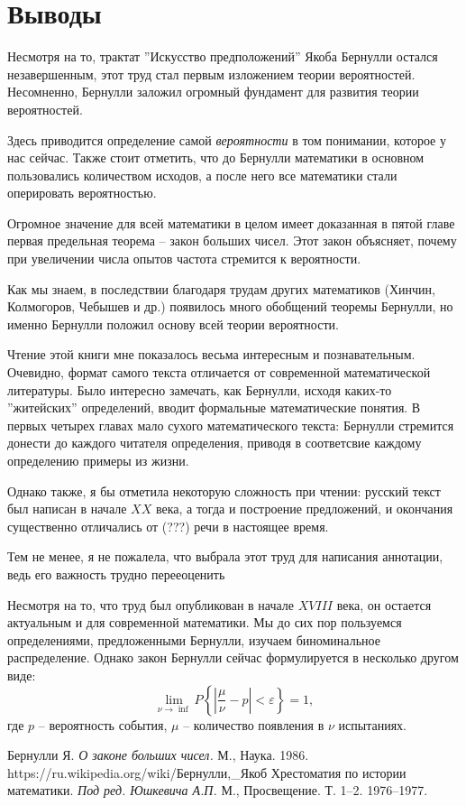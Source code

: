 \documentclass[12pt]{article}
\begin{document}
\newpage
\section{Выводы}
Несмотря на то, трактат ''Искусство предположений'' Якоба Бернулли остался незавершенным, этот труд стал первым изложением теории вероятностей. 
Несомненно, Бернулли заложил огромный фундамент для развития теории вероятностей.

Здесь приводится определение самой \textit{вероятности} в том понимании, которое у нас сейчас.
Также стоит отметить, что до Бернулли математики в основном пользовались количеством исходов, а после него все математики стали оперировать вероятностью.

Огромное значение для всей математики в целом имеет доказанная в пятой главе первая предельная теорема -- закон больших чисел.
Этот закон объясняет, почему при увеличении числа опытов частота стремится к вероятности.

Как мы знаем, в последствии благодаря трудам других математиков (Хинчин, Колмогоров, Чебышев и др.) появилось много обобщений теоремы Бернулли, но именно Бернулли положил основу всей теории вероятности.

Чтение этой книги мне показалось весьма интересным и познавательным. 
Очевидно, формат самого текста отличается от современной математической литературы.
Было интересно замечать, как Бернулли, исходя каких-то ''житейских'' определений, вводит формальные математические понятия.
В первых четырех главах мало сухого математического текста: Бернулли стремится донести до каждого читателя определения, приводя в соответсвие каждому определению примеры из жизни.

Однако также, я бы отметила некоторую сложность при чтении: русский текст был написан в начале $XX$ века, а тогда и построение предложений, и окончания существенно отличались от (???) речи в настоящее время.

Тем не менее, я не пожалела, что выбрала этот труд для написания аннотации, ведь его важность трудно перееоценить

Несмотря на то, что труд был опубликован в начале $XVIII$ века, он остается актуальным и для современной математики. 
Мы до сих пор пользуемся определениями, предложенными Бернулли, изучаем биноминальное распределение.
Однако закон Бернулли сейчас формулируется в несколько другом виде:
$$\lim\limits_{\nu \to \inf} P \left\{ \left| \frac{\mu}{\nu} - p\right| < \varepsilon \right\} = 1,$$
 где $p$ -- вероятность события, $\mu$ -- количество появления в $\nu$ испытаниях.
 
 
\newpage
\begin{thebibliography}{99}
 Бернулли Я. \textit{О законе больших чисел.} М., Наука. 1986.
 https://ru.wikipedia.org/wiki/Бернулли,\_Якоб
 Хрестоматия по истории математики. \textit{Под ред. Юшкевича А.П.} М., Просвещение. Т. 1–2. 1976–1977.

\end{thebibliography}
\end{document}
